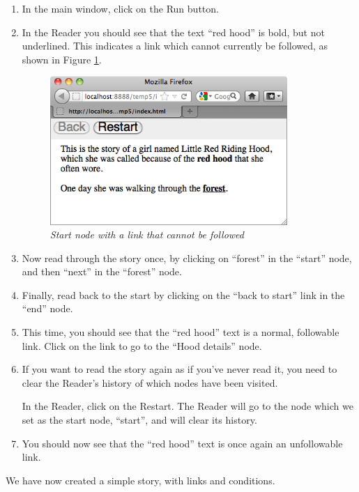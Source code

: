 \documentclass{article}
\begin{document}
\begin{enumerate}
  \item In the main window, click on the Run button.
  \item In the Reader you should see that the text ``red hood'' is bold,
  but not underlined. This indicates a link which cannot currently be
  followed, as shown in Figure \ref{fig:start_with_condition}.
 
\begin{figure}[ht]
  \centering
  \includegraphics[width=9cm]{images/hypedyn-tutorial-1-figure-15}
  \caption{\textit{Start node with a link that cannot be followed}}
  \label{fig:start_with_condition}
\end{figure} 

\item Now read through the story once, by clicking on ``forest'' in the
``start'' node, and then ``next'' in the ``forest'' node.
\item Finally, read back to the start by clicking on the ``back to start'' link
in the ``end'' node.
\item This time, you should see that the ``red hood'' text is a normal,
followable link. Click on the link to go to the ``Hood details'' node.

\item If you want to read the story again as if you've never read it, you need
to clear the Reader's history of which nodes have been visited.

In the Reader, click on the Restart. The Reader will go to the node which
we set as the start node, ``start'', and will clear its history.

\item You should now see that the ``red hood'' text is once again an
unfollowable link.
\end{enumerate}

We have now created a simple story, with links and conditions.
\end{document}

